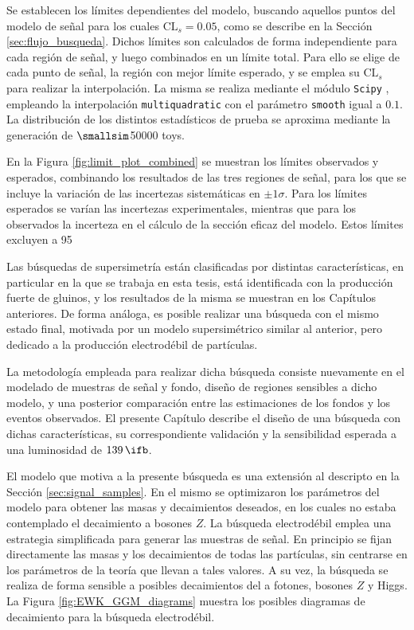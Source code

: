 Se establecen los límites dependientes del modelo, buscando aquellos puntos del modelo de señal para los cuales $\text{CL}_{s}=0.05$, como se describe en la Sección \ref{sec:flujo_busqueda}. Dichos límites son calculados de forma independiente para cada región de señal, y luego combinados en un límite total. Para ello se elige de cada punto de señal, la región con mejor límite esperado, y se emplea su $\text{CL}_{s}$ para realizar la interpolación. La misma se realiza mediante el módulo \texttt{Scipy} \cite{Virtanen:2019joe}, empleando la interpolación \texttt{multiquadratic} con el parámetro \texttt{smooth} igual a $0.1$. La distribución de los distintos estadísticos de prueba se aproxima mediante la generación de {$\smallsim$}50000 toys.

En la Figura \ref{fig:limit_plot_combined} se muestran los límites observados y esperados, combinando los resultados de las tres regiones de señal, para los que se incluye la variación de las incertezas sistemáticas en $\pm1\sigma$. Para los límites esperados se varían las incertezas experimentales, mientras que para los observados la incerteza en el cálculo de la sección eficaz del modelo. Estos límites excluyen a 95


Las búsquedas de supersimetría están clasificadas por distintas características, en particular en la que se trabaja en esta tesis, está identificada con la producción fuerte de gluinos, y los resultados de la misma se muestran en los Capítulos anteriores. De forma análoga, es posible realizar una búsqueda con el mismo estado final, motivada por un modelo supersimétrico similar al anterior, pero dedicado a la producción electrodébil de partículas.

La metodología empleada para realizar dicha búsqueda consiste nuevamente en el modelado de muestras de señal y fondo, diseño de regiones sensibles a dicho modelo, y una posterior comparación entre las estimaciones de los fondos y los eventos observados. El presente Capítulo describe el diseño de una búsqueda con dichas características, su correspondiente validación y la sensibilidad esperada a una luminosidad de $139\,\ifb$. 



El modelo que motiva a la presente búsqueda es una extensión al descripto en la Sección \ref{sec:signal_samples}. En el mismo se optimizaron los parámetros del modelo para obtener las masas y decaimientos deseados, en los cuales no estaba contemplado el decaimiento a bosones $Z$. La búsqueda electrodébil emplea una estrategia simplificada para generar las muestras de señal. En principio se fijan directamente las masas y los decaimientos de todas las partículas, sin centrarse en los parámetros de la teoría que llevan a tales valores. A su vez, la búsqueda se realiza de forma sensible a posibles decaimientos del \ninoone a fotones, bosones $Z$ y Higgs. La Figura \ref{fig:EWK_GGM_diagrams} muestra los posibles diagramas de decaimiento para la búsqueda electrodébil.



